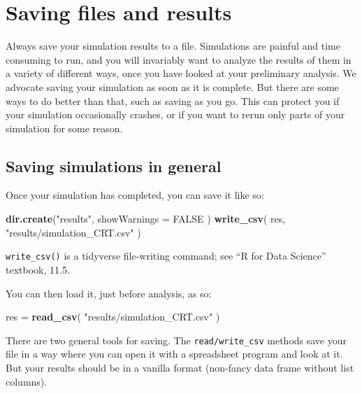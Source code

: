 \documentclass[
]{book}
\newenvironment{Shaded}{\begin{snugshade}}{\end{snugshade}}
\newcommand{\AttributeTok}[1]{\textcolor[rgb]{0.13,0.29,0.53}{#1}}
\newcommand{\ConstantTok}[1]{\textcolor[rgb]{0.56,0.35,0.01}{#1}}
\newcommand{\FunctionTok}[1]{\textcolor[rgb]{0.13,0.29,0.53}{\textbf{#1}}}
\newcommand{\NormalTok}[1]{#1}
\newcommand{\OtherTok}[1]{\textcolor[rgb]{0.56,0.35,0.01}{#1}}
\newcommand{\StringTok}[1]{\textcolor[rgb]{0.31,0.60,0.02}{#1}}
\begin{document}
\chapter{Saving files and results}\label{saving-files}

Always save your simulation results to a file.
Simulations are painful and time consuming to run, and you will invariably want to analyze the results of them in a variety of different ways, once you have looked at your preliminary analysis.
We advocate saving your simulation as soon as it is complete.
But there are some ways to do better than that, such as saving as you go.
This can protect you if your simulation occasionally crashes, or if you want to rerun only parts of your simulation for some reason.

\section{Saving simulations in general}\label{saving-simulations-in-general}

Once your simulation has completed, you can save it like so:

\begin{Shaded}
\begin{Highlighting}[]
\FunctionTok{dir.create}\NormalTok{(}\StringTok{"results"}\NormalTok{, }\AttributeTok{showWarnings =} \ConstantTok{FALSE}\NormalTok{ )}
\FunctionTok{write\_csv}\NormalTok{( res, }\StringTok{"results/simulation\_CRT.csv"}\NormalTok{ )}
\end{Highlighting}
\end{Shaded}

\texttt{write\_csv()} is a tidyverse file-writing command; see ``R for Data Science''
textbook, 11.5.

You can then load it, just before analysis, as so:

\begin{Shaded}
\begin{Highlighting}[]
\NormalTok{res }\OtherTok{=} \FunctionTok{read\_csv}\NormalTok{( }\StringTok{"results/simulation\_CRT.csv"}\NormalTok{ )}
\end{Highlighting}
\end{Shaded}

There are two general tools for saving. The \texttt{read/write\_csv} methods save your file in a way where you can open it with a spreadsheet program and look at it.
But your results should be in a vanilla format (non-fancy data frame without list columns).
\end{document}
